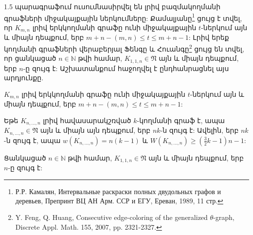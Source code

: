 1.5 պարագրաֆում ուսումնասիրվել են լրիվ բազմակողմանի գրաֆների միջակայքային ներկումները: Քամալյանը\footnote{Р.Р. Камалян, Интервальные раскраски полных двудольных графов и деревьев, Препринт ВЦ АН Арм. ССР и ЕГУ, Ереван, 1989, 11 стр. } ցույց է տվել, որ $K_{m,n}$ լրիվ երկկողմանի գրաֆը ունի միջակայքային $t$-ներկում այն և միայն դեպքում, երբ $m+n-(m,n) \leq t \leq m+n-1$: Լրիվ երեք կողմանի գրաֆների վերաբերյալ Ֆենգը և Հուանգը\footnote{Y. Feng, Q. Huang, Consecutive edge-coloring of the generalized $\theta$-graph, Discrete Appl. Math. 155, 2007, pp. 2321-2327.} ցույց են տվել, որ ցանկացած $n\in\mathbb{N}$ թվի համար, $K_{1,1,n}\in \mathfrak{N}$ այն և միայն դեպքում, երբ $n$-ը զույգ է: Աշխատանքում հաջողվել է ընդհանրացնել այս արդյունքը.

\begin{hide}
\begin{theorem}
\label{t1_complete_bipartite} 
$K_{m,n}$ լրիվ երկկողմանի գրաֆը ունի միջակայքային $t$-ներկում այն և միայն դեպքում, երբ $m+n-(m,n) \leq t \leq m+n-1$:
\end{theorem}

\begin{theorem}
\label{t1-complete-balanced-Petrosyan}
\cite{Petrosyan2012} Եթե $K_{n,\ldots,n}$ լրիվ հավասարակշռված $k$-կողմանի գրաֆ է, ապա
$K_{n,\ldots,n} \in \mathfrak{N}$ այն և միայն այն դեպքում, երբ $nk$-ն զույգ է: Ավելին, երբ $nk$-ն զույգ է, ապա $w(K_{n,\ldots,n}) = n(k-1)$ և $W(K_{n,\ldots,n}) \geq \left(
\frac{3}{2}k-1 \right)n-1$:
\end{theorem}

\begin{theorem}
\label{FengHuang}
\cite{FengHuang2007} Ցանկացած $n\in\mathbb{N}$ թվի համար, $K_{1,1,n}\in \mathfrak{N}$ այն և միայն դեպքում, երբ $n$-ը զույգ է:
\end{theorem}


\end{hide}
